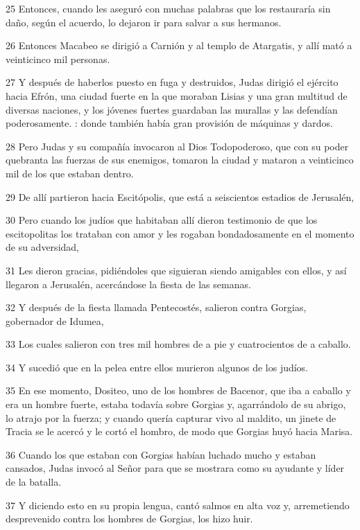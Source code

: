 \par 25 Entonces, cuando les aseguró con muchas palabras que los restauraría sin daño, según el acuerdo, lo dejaron ir para salvar a sus hermanos.
\par 26 Entonces Macabeo se dirigió a Carnión y al templo de Atargatis, y allí mató a veinticinco mil personas.
\par 27 Y después de haberlos puesto en fuga y destruidos, Judas dirigió el ejército hacia Efrón, una ciudad fuerte en la que moraban Lisias y una gran multitud de diversas naciones, y los jóvenes fuertes guardaban las murallas y las defendían poderosamente. : donde también había gran provisión de máquinas y dardos.
\par 28 Pero Judas y su compañía invocaron al Dios Todopoderoso, que con su poder quebranta las fuerzas de sus enemigos, tomaron la ciudad y mataron a veinticinco mil de los que estaban dentro.
\par 29 De allí partieron hacia Escitópolis, que está a seiscientos estadios de Jerusalén,
\par 30 Pero cuando los judíos que habitaban allí dieron testimonio de que los escitopolitas los trataban con amor y les rogaban bondadosamente en el momento de su adversidad,
\par 31 Les dieron gracias, pidiéndoles que siguieran siendo amigables con ellos, y así llegaron a Jerusalén, acercándose la fiesta de las semanas.
\par 32 Y después de la fiesta llamada Pentecostés, salieron contra Gorgias, gobernador de Idumea,
\par 33 Los cuales salieron con tres mil hombres de a pie y cuatrocientos de a caballo.
\par 34 Y sucedió que en la pelea entre ellos murieron algunos de los judíos.
\par 35 En ese momento, Dositeo, uno de los hombres de Bacenor, que iba a caballo y era un hombre fuerte, estaba todavía sobre Gorgias y, agarrándolo de su abrigo, lo atrajo por la fuerza; y cuando quería capturar vivo al maldito, un jinete de Tracia se le acercó y le cortó el hombro, de modo que Gorgias huyó hacia Marisa.
\par 36 Cuando los que estaban con Gorgias habían luchado mucho y estaban cansados, Judas invocó al Señor para que se mostrara como su ayudante y líder de la batalla.
\par 37 Y diciendo esto en su propia lengua, cantó salmos en alta voz y, arremetiendo desprevenido contra los hombres de Gorgias, los hizo huir.
